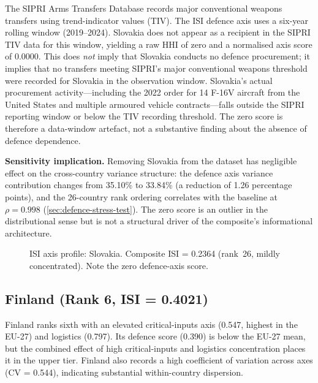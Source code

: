 \begin{tcolorbox}[
  colback=yellow!5, colframe=yellow!60!black,
  title={\small\bfseries Technical note: Slovakia's zero defence score},
  fonttitle=\small, boxrule=0.5pt, arc=2pt,
  left=4pt, right=4pt, top=3pt, bottom=3pt
]
\small
The SIPRI Arms Transfers Database records major conventional weapons
transfers using trend-indicator values (TIV).  The ISI defence axis
uses a six-year rolling window (2019--2024).  Slovakia does not
appear as a recipient in the SIPRI TIV data for this window, yielding
a raw HHI of zero and a normalised axis score of \num{0.0000}.
This does \emph{not} imply that Slovakia conducts no defence
procurement; it implies that no transfers meeting SIPRI's major
conventional weapons threshold were recorded for Slovakia in the
observation window.  Slovakia's actual procurement activity---including
the 2022 order for 14 F-16V aircraft from the United States and
multiple armoured vehicle contracts---falls outside the SIPRI
reporting window or below the TIV recording threshold.  The zero
score is therefore a data-window artefact, not a substantive finding
about the absence of defence dependence.

\smallskip\noindent
\textbf{Sensitivity implication.}  Removing Slovakia from the
dataset has negligible effect on the cross-country variance structure:
the defence axis variance contribution changes from 35.10\% to
33.84\% (a reduction of 1.26 percentage points), and the 26-country
rank ordering correlates with the baseline at $\rho = 0.998$
(\cref{sec:defence-stress-test}).  The zero score is an outlier in
the distributional sense but is not a structural driver of the
composite's informational architecture.
\end{tcolorbox}

\begin{figure}[htbp]
\centering

\caption{ISI axis profile: Slovakia.  Composite ISI = 0.2364
  (rank~26, mildly concentrated).  Note the zero defence-axis score.}
\label{fig:radar-SK}
\end{figure}

\subsection{Finland (Rank 6, ISI = 0.4021)}

Finland ranks sixth with an elevated critical-inputs axis (0.547,
highest in the EU-27) and logistics (0.797).  Its defence score
(0.390) is below the EU-27 mean, but the combined effect of high
critical-inputs and logistics concentration places it in the upper
tier.  Finland also records a high coefficient of variation across
axes (CV = 0.544), indicating substantial within-country dispersion.

